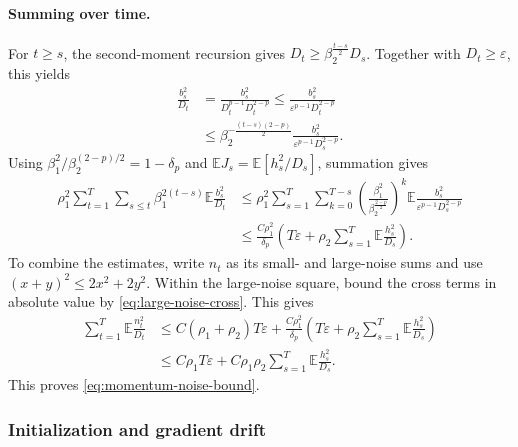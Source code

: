 \documentclass[11pt,letterpaper]{article}
\theoremstyle{definition}
\newcommand{\E}{\mathbb E}
\newcommand{\eps}{\varepsilon}
\begin{document}
\paragraph{Summing over time.}
For $t\ge s$, the second-moment recursion gives
$D_t\ge\beta_2^{\frac{t-s}{2}}D_s$. Together with $D_t\ge\eps$,
this yields
\begin{align*}
\frac{b_s^2}{D_t}
&=\frac{b_s^2}{D_t^{p-1}D_t^{2-p}}
\le\frac{b_s^2}{\eps^{p-1}D_t^{2-p}}\\
&\le\beta_2^{-\frac{(t-s)(2-p)}{2}}
\frac{b_s^2}{\eps^{p-1}D_s^{2-p}}.
\end{align*}
Using $\beta_1^2/\beta_2^{(2-p)/2}=1-\delta_p$ and
$\E J_s=\E[h_s^2/D_s]$, summation gives
\begin{align*}
\rho_1^2\sum_{t=1}^T\sum_{s\le t}\beta_1^{2(t-s)}
\E\frac{b_s^2}{D_t}
&\le\rho_1^2\sum_{s=1}^T\sum_{k=0}^{T-s}
\left(\frac{\beta_1^2}{\beta_2^{\frac{2-p}{2}}}\right)^k
\E\frac{b_s^2}{\eps^{p-1}D_s^{2-p}}\\
&\le\frac{C\rho_1^2}{\delta_p}
\left(T\eps+\rho_2\sum_{s=1}^T\E\frac{h_s^2}{D_s}\right).
\end{align*}
To combine the estimates, write $n_t$ as its small- and large-noise
sums and use $(x+y)^2\le2x^2+2y^2$. Within the large-noise square,
bound the cross terms in absolute value by \eqref{eq:large-noise-cross}.
This gives
\begin{align*}
\sum_{t=1}^T\E\frac{n_t^2}{D_t}
&\le C(\rho_1+\rho_2)T\eps
+\frac{C\rho_1^2}{\delta_p}
\left(T\eps+\rho_2\sum_{s=1}^T\E\frac{h_s^2}{D_s}\right)\\
&\le C\rho_1T\eps
+C\rho_1\rho_2\sum_{s=1}^T\E\frac{h_s^2}{D_s}.
\end{align*}
This proves \eqref{eq:momentum-noise-bound}.

\subsubsection{Initialization and gradient drift}
\end{document}
